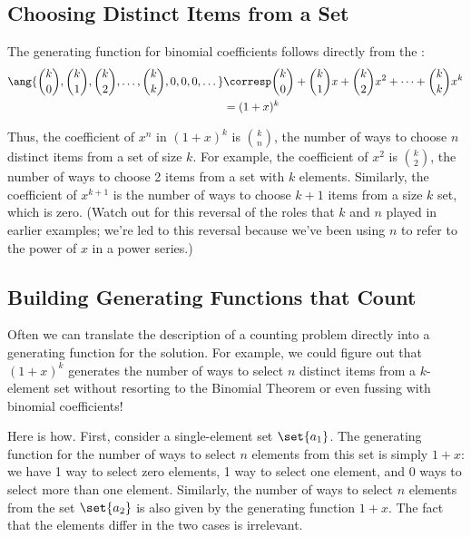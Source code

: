 \subsection{Choosing Distinct Items from a Set}

The generating function for binomial coefficients follows directly
from the :
%
\begin{align*}
\ang{ \binom{k}{0}, \binom{k}{1}, \binom{k}{2}, \dots, \binom{k}{k},
        0, 0, 0, \dots }
    & \corresp \binom{k}{0} + \binom{k}{1} x + \binom{k}{2} x^2 + \cdots + \binom{k}{k} x^k \\
    & = (1 + x)^k
\end{align*}

Thus, the coefficient of $x^n$ in $(1 + x)^k$ is $\binom{k}{n}$, the
number of ways to choose $n$ distinct items from a set of size $k$.  For
example, the coefficient of $x^2$ is $\binom{k}{2}$, the number of ways to
choose 2 items from a set with $k$ elements.  Similarly, the coefficient
of $x^{k+1}$ is the number of ways to choose $k+1$ items from a size $k$
set, which is zero.  (Watch out for this reversal of the roles that $k$
and $n$ played in earlier examples; we're led to this reversal because
we've been using $n$ to refer to the power of $x$ in a power series.)

\subsection{Building Generating Functions that Count}

Often we can translate the description of a counting problem directly
into a generating function for the solution.  For example, we could
figure out that $(1 + x)^k$ generates the number of ways to select $n$
distinct items from a $k$-element set without resorting to the
Binomial Theorem or even fussing with binomial coefficients!

Here is how.  First, consider a single-element set $\set{a_1}$.  The
generating function for the number of ways to select $n$ elements from
this set is simply $1 + x$: we have 1 way to select zero elements, 1
way to select one element, and 0 ways to select more than one element.
Similarly, the number of ways to select $n$ elements from the set
$\set{a_2}$ is also given by the generating function $1 + x$.  The
fact that the elements differ in the two cases is irrelevant.

